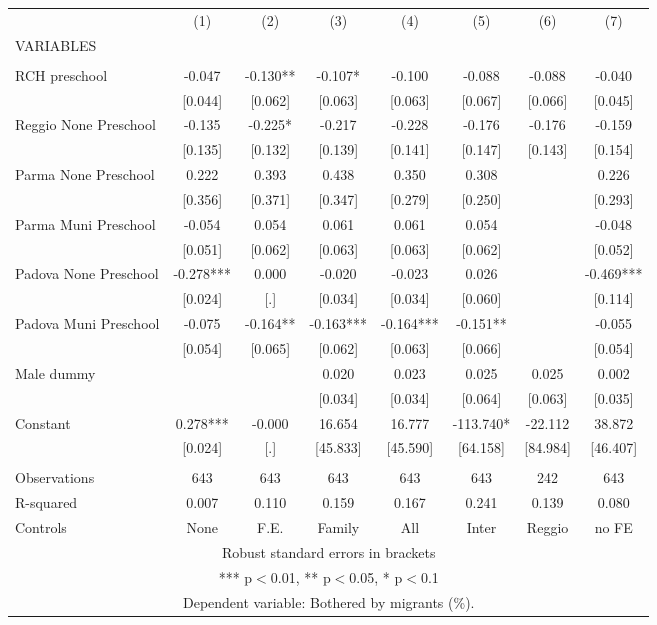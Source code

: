 \begin{tabular}{lccccccc} \hline
 & (1) & (2) & (3) & (4) & (5) & (6) & (7) \\
VARIABLES &  &  &  &  &  &  &  \\ \hline
 &  &  &  &  &  &  &  \\
RCH preschool & -0.047 & -0.130** & -0.107* & -0.100 & -0.088 & -0.088 & -0.040 \\
 & [0.044] & [0.062] & [0.063] & [0.063] & [0.067] & [0.066] & [0.045] \\
Reggio None Preschool & -0.135 & -0.225* & -0.217 & -0.228 & -0.176 & -0.176 & -0.159 \\
 & [0.135] & [0.132] & [0.139] & [0.141] & [0.147] & [0.143] & [0.154] \\
Parma None Preschool & 0.222 & 0.393 & 0.438 & 0.350 & 0.308 &  & 0.226 \\
 & [0.356] & [0.371] & [0.347] & [0.279] & [0.250] &  & [0.293] \\
Parma Muni Preschool & -0.054 & 0.054 & 0.061 & 0.061 & 0.054 &  & -0.048 \\
 & [0.051] & [0.062] & [0.063] & [0.063] & [0.062] &  & [0.052] \\
Padova None Preschool & -0.278*** & 0.000 & -0.020 & -0.023 & 0.026 &  & -0.469*** \\
 & [0.024] & [.] & [0.034] & [0.034] & [0.060] &  & [0.114] \\
Padova Muni Preschool & -0.075 & -0.164** & -0.163*** & -0.164*** & -0.151** &  & -0.055 \\
 & [0.054] & [0.065] & [0.062] & [0.063] & [0.066] &  & [0.054] \\
Male dummy &  &  & 0.020 & 0.023 & 0.025 & 0.025 & 0.002 \\
 &  &  & [0.034] & [0.034] & [0.064] & [0.063] & [0.035] \\
Constant & 0.278*** & -0.000 & 16.654 & 16.777 & -113.740* & -22.112 & 38.872 \\
 & [0.024] & [.] & [45.833] & [45.590] & [64.158] & [84.984] & [46.407] \\
 &  &  &  &  &  &  &  \\
Observations & 643 & 643 & 643 & 643 & 643 & 242 & 643 \\
R-squared & 0.007 & 0.110 & 0.159 & 0.167 & 0.241 & 0.139 & 0.080 \\
 Controls & None & F.E. & Family & All & Inter & Reggio & no FE \\ \hline
\multicolumn{8}{c}{ Robust standard errors in brackets} \\
\multicolumn{8}{c}{ *** p$<$0.01, ** p$<$0.05, * p$<$0.1} \\
\multicolumn{8}{c}{ Dependent variable: Bothered by migrants (\%).} \\
\end{tabular}
